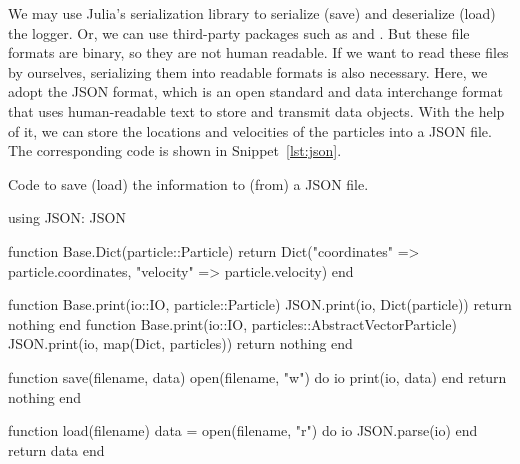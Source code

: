 We may use Julia's serialization library  to
serialize (save) and deserialize (load) the logger. Or, we can use third-party packages
such as \href{https://github.com/JuliaIO/JLD.jl}{} and
\href{https://github.com/JuliaIO/JLD2.jl}{}.
But these file formats are binary, so they are not human readable.
If we want to read these files by ourselves, serializing them into readable formats
is also necessary. Here, we adopt the JSON format, which
is an open standard and data interchange format that uses human-readable text to
store and transmit data objects. With the help of it, we can store the locations
and velocities of the particles into a JSON file. The corresponding code is shown in
Snippet~\ref{lst:json}.
%
\begin{algorithm}
    \caption{Code to save (load) the information to (from) a JSON file.}
    \label{lst:json}
    \begin{juliacode}
        using JSON: JSON

        function Base.Dict(particle::Particle)
            return Dict("coordinates" => particle.coordinates, "velocity" => particle.velocity)
        end

        function Base.print(io::IO, particle::Particle)
            JSON.print(io, Dict(particle))
            return nothing
        end
        function Base.print(io::IO, particles::AbstractVector{Particle})
            JSON.print(io, map(Dict, particles))
            return nothing
        end

        function save(filename, data)
            open(filename, "w") do io
                print(io, data)
            end
            return nothing
        end

        function load(filename)
            data = open(filename, "r") do io
                JSON.parse(io)
            end
            return data
        end
    \end{juliacode}
\end{algorithm}
